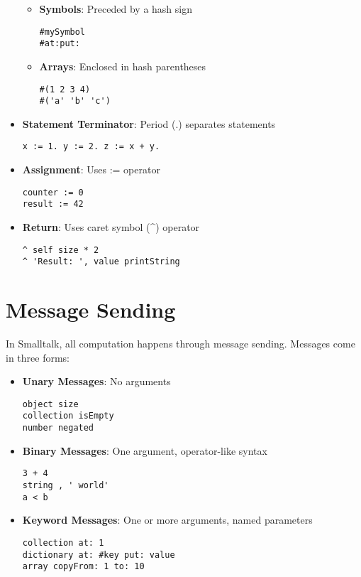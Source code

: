 \documentclass[12pt,a4paper]{report}
\begin{document}
\begin{itemize}
\begin{itemize}
        \item \textbf{Symbols}: Preceded by a hash sign
        \begin{lstlisting}[style=smalltalk]
#mySymbol
#at:put:
\end{lstlisting}

        \item \textbf{Arrays}: Enclosed in hash parentheses
        \begin{lstlisting}[style=smalltalk]
#(1 2 3 4)
#('a' 'b' 'c')
\end{lstlisting}
    \end{itemize}

    \item \textbf{Statement Terminator}: Period (.) separates statements
    \begin{lstlisting}[style=smalltalk]
x := 1. y := 2. z := x + y.
\end{lstlisting}

    \item \textbf{Assignment}: Uses := operator
    \begin{lstlisting}[style=smalltalk]
counter := 0
result := 42
\end{lstlisting}

    \item \textbf{Return}: Uses caret symbol (\textasciicircum) operator
    \begin{lstlisting}[style=smalltalk]
^ self size * 2
^ 'Result: ', value printString
\end{lstlisting}
\end{itemize}

\section{Message Sending}

In Smalltalk, all computation happens through message sending. Messages come in three forms:

\begin{itemize}
    \item \textbf{Unary Messages}: No arguments
    \begin{lstlisting}[style=smalltalk]
object size
collection isEmpty
number negated
\end{lstlisting}

    \item \textbf{Binary Messages}: One argument, operator-like syntax
    \begin{lstlisting}[style=smalltalk]
3 + 4
string , ' world'
a < b
\end{lstlisting}

    \item \textbf{Keyword Messages}: One or more arguments, named parameters
    \begin{lstlisting}[style=smalltalk]
collection at: 1
dictionary at: #key put: value
array copyFrom: 1 to: 10
\end{lstlisting}
\end{itemize}
\end{document}

